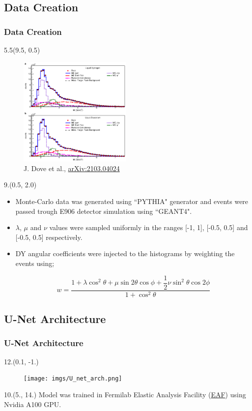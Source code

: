 \documentclass[12pt, xcolor={dvipsnames}, aspectratio = 169, sans, mathserif]{beamer}
\newenvironment{List}[2]
{\begin{textblock}{#1}#2
\begin{itemize}}
{\end{itemize}
\end{textblock}}
\newenvironment{Pic}[2]
{\begin{textblock}{#1}#2
\begin{figure}}
{\end{figure}
\end{textblock}}
\newcommand{\NewCaption}[3]{\caption{{#1}, \textcolor{blue}{\href{#2}{#3}}}}
\begin{document}
\subsection{Data Creation}
\begin{frame}
\frametitle{Data Creation}

\begin{Pic}{5.5}{(9.5, 0.5)}
  \NewCaption{J. Dove et al.}{https://arxiv.org/abs/2103.04024}{arXiv:2103.04024}
  \includegraphics[width=5.5cm]{imgs/mc2real.png}
\end{Pic}

\begin{List}{9.}{(0.5, 2.0)}

  \item Monte-Carlo data was generated using ``PYTHIA" generator and events were passed trough E906 detector simulation using ``GEANT4".

  \item $\lambda$, $\mu$ and $\nu$ values were sampled uniformly in the ranges [-1, 1], [-0.5, 0.5] and [-0.5, 0.5] respectively.

  \item DY angular coefficients were injected to the histograms by weighting the events using;

  \begin{equation*}
w = \frac{1  + \lambda \cos^{2}\theta + \mu \sin 2 \theta \cos \phi + \dfrac{1}{2}\nu \sin^{2}\theta \cos 2 \phi}{1 + \cos^{2}\theta}
  \end{equation*}

\end{List}
\end{frame}

\subsection{U-Net Architecture}

\begin{frame}
\frametitle{U-Net Architecture}

\begin{Pic}{12.}{(0.1, -1.)}
  \texttt{[image: imgs/U\_net\_arch.png]}
\end{Pic}

\begin{textblock}{10.}(5., 14.)
Model was trained in  Fermilab Elastic Analysis Facility (\textcolor{blue}{\href{https://eafjupyter.readthedocs.io/en/latest/index.html}{EAF}}) using Nvidia A100 GPU.
\end{textblock}

\end{frame}
\end{document}
